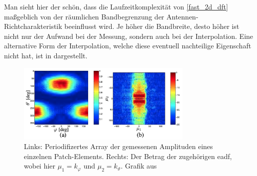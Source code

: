 Man sieht hier der sch\"on, dass die Laufzeitkomplexit\"at von \eqref{fast_2d_dft} ma{\ss}geblich von der r\"aumlichen Bandbegrenzung der Antennen-Richtcharakteristik beeinflusst wird. Je h\"oher die Bandbreite, desto h\"oher ist nicht nur der Aufwand bei der Messung, sondern auch bei der Interpolation. Eine alternative Form der Interpolation, welche diese eventuell nachteilige Eigenschaft nicht hat, ist in  dargestellt.

\begin{figure}
    \centering\includegraphics[width=0.75\textwidth]{img/eadf/bp_aperture.png}
    \caption{Links: Periodifizertes Array der gemessenen Amplituden eines einzelnen Patch-Elements. Rechts: Der Betrag der zugeh\"origen \gls{eadf}, wobei hier $\mu_1 = k_\varphi$ und $\mu_2 = k_\vartheta$. Grafik aus~\cite{landmann2004EADF}}\label{eadf_bp_aperture}
\end{figure}
